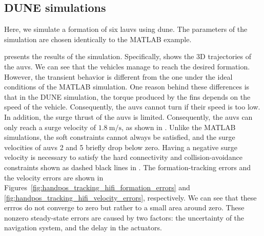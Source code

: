\subsection{DUNE simulations}


Here, we simulate a formation of six \glspl{lauv} using \gls{dune}.
The parameters of the simulation are chosen identically to the MATLAB example.

 presents the results of the simulation.
Specifically,  shows the 3D trajectories of the \glspl{auv}.
We can see that the vehicles manage to reach the desired formation. However, the transient behavior is different from the one under the ideal conditions of the MATLAB simulation.
One reason behind these differences is that in the DUNE simulation, the torque produced by the fins depends on the speed of the vehicle.
Consequently, the \glspl{auv} cannot turn if their speed is too low.
In addition, the surge thrust of the \glspl{auv} is limited.
Consequently, the \glspl{auv} can only reach a surge velocity of $\SI{1.8}{\meter\per\second}$, as shown in .
Unlike the MATLAB simulations, the soft constraints cannot always be satisfied, and the surge velocities of \glspl{auv} 2 and 5 briefly drop below zero.
Having a negative surge velocity is necessary to satisfy the hard connectivity and collision-avoidance constraints shown as dashed black lines in .
The formation-tracking errors and the velocity errors are shown in Figures~\ref{fig:handpos_tracking_hifi_formation_errors} and \ref{fig:handpos_tracking_hifi_velocity_errors}, respectively.
We can see that these errros do not converge to zero but rather to a small area around zero.
These nonzero steady-state errors are caused by two factors: the uncertainty of the navigation system, and the delay in the actuators.
